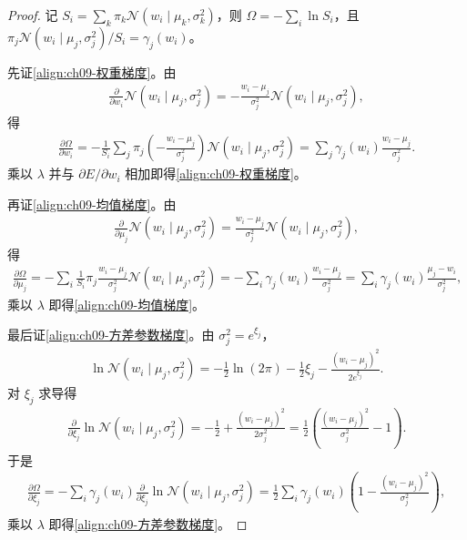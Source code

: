 \documentclass[../../main.tex]{subfiles}
\begin{document}
\begin{proof}
记 $S_{i}=\sum_{k}\pi_{k}\mathcal{N}(w_{i}\mid\mu_{k},\sigma_{k}^{2})$，则 $\Omega=-\sum_{i}\ln S_{i}$，且 $\pi_{j}\mathcal{N}(w_{i}\mid\mu_{j},\sigma_{j}^{2})/S_{i}=\gamma_{j}(w_{i})$。

先证\eqref{align:ch09-权重梯度}。由
\begin{align*}
\frac{\partial}{\partial w_{i}}\mathcal{N}(w_{i}\mid\mu_{j},\sigma_{j}^{2})=-\frac{w_{i}-\mu_{j}}{\sigma_{j}^{2}}\mathcal{N}(w_{i}\mid\mu_{j},\sigma_{j}^{2}),
\end{align*}
得
\begin{align*}
\frac{\partial\Omega}{\partial w_{i}}=-\frac{1}{S_{i}}\sum_{j}\pi_{j}\left(-\frac{w_{i}-\mu_{j}}{\sigma_{j}^{2}}\right)\mathcal{N}(w_{i}\mid\mu_{j},\sigma_{j}^{2})=\sum_{j}\gamma_{j}(w_{i})\frac{w_{i}-\mu_{j}}{\sigma_{j}^{2}}.
\end{align*}
乘以 $\lambda$ 并与 $\partial E/\partial w_{i}$ 相加即得\eqref{align:ch09-权重梯度}。

再证\eqref{align:ch09-均值梯度}。由
\begin{align*}
\frac{\partial}{\partial\mu_{j}}\mathcal{N}(w_{i}\mid\mu_{j},\sigma_{j}^{2})=\frac{w_{i}-\mu_{j}}{\sigma_{j}^{2}}\mathcal{N}(w_{i}\mid\mu_{j},\sigma_{j}^{2}),
\end{align*}
得
\begin{align*}
\frac{\partial\Omega}{\partial\mu_{j}}=-\sum_{i}\frac{1}{S_{i}}\pi_{j}\frac{w_{i}-\mu_{j}}{\sigma_{j}^{2}}\mathcal{N}(w_{i}\mid\mu_{j},\sigma_{j}^{2})=-\sum_{i}\gamma_{j}(w_{i})\frac{w_{i}-\mu_{j}}{\sigma_{j}^{2}}=\sum_{i}\gamma_{j}(w_{i})\frac{\mu_{j}-w_{i}}{\sigma_{j}^{2}},
\end{align*}
乘以 $\lambda$ 即得\eqref{align:ch09-均值梯度}。

最后证\eqref{align:ch09-方差参数梯度}。由 $\sigma_{j}^{2}=e^{\xi_{j}}$，
\begin{align*}
\ln\mathcal{N}(w_{i}\mid\mu_{j},\sigma_{j}^{2})=-\frac{1}{2}\ln(2\pi)-\frac{1}{2}\xi_{j}-\frac{(w_{i}-\mu_{j})^{2}}{2e^{\xi_{j}}}.
\end{align*}
对 $\xi_{j}$ 求导得
\begin{align*}
\frac{\partial}{\partial\xi_{j}}\ln\mathcal{N}(w_{i}\mid\mu_{j},\sigma_{j}^{2})=-\frac{1}{2}+\frac{(w_{i}-\mu_{j})^{2}}{2\sigma_{j}^{2}}=\frac{1}{2}\left(\frac{(w_{i}-\mu_{j})^{2}}{\sigma_{j}^{2}}-1\right).
\end{align*}
于是
\begin{align*}
\frac{\partial\Omega}{\partial\xi_{j}}=-\sum_{i}\gamma_{j}(w_{i})\frac{\partial}{\partial\xi_{j}}\ln\mathcal{N}(w_{i}\mid\mu_{j},\sigma_{j}^{2})=\frac{1}{2}\sum_{i}\gamma_{j}(w_{i})\left(1-\frac{(w_{i}-\mu_{j})^{2}}{\sigma_{j}^{2}}\right),
\end{align*}
乘以 $\lambda$ 即得\eqref{align:ch09-方差参数梯度}。
\end{proof}
\end{document}

